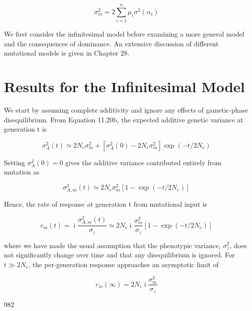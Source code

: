 \documentclass{article}
\begin{document}
{\begin{equation}
\sigma_{m}^{2}=2\sum_{i=1}^{n}\mu_{i}\sigma^{2}(\alpha_{i})
\end{equation}

We first consider the infinitesimal model before examining a more general model and the consequences of dominance. An extensive discussion of different mutational models is given in Chapter 28.

\section{Results for the Infinitesimal Model}
We start by assuming complete additivity and ignore any effects of gametic-phase disequilibrium. From Equation 11.20b, the expected additive genetic variance at generation t is

\begin{equation}
\sigma_{A}^{2}(t)\simeq2N_{e}\sigma_{m}^{2}+\left[\sigma_{A}^{2}(0)-2N_{e}\sigma_{m}^{2}\right]\exp(-t/2N_{e})
\tag{26.27}
\label{eq:26_27}
\end{equation}

Setting  $ \sigma_{A}^{2}(0)=0 $ gives the additive variance contributed entirely from mutation as

\begin{equation}
\sigma_{A,m}^{2}(t)\simeq2N_{e}\sigma_{m}^{2}\left[1-\exp(-t/2N_{e})\right]
\tag{26.28a}
\label{eq:26_28a}
\end{equation}

Hence, the rate of response at generation t from mutational input is

\begin{equation}
r_{m}(t)=\overline{\imath}\frac{\sigma_{A,m}^{2}(t)}{\sigma_{z}}\simeq2N_{e}\overline{\imath}\frac{\sigma_{m}^{2}}{\sigma_{z}}\left[1-\exp(-t/2N_{e})\right]
\tag{26.28b}
\label{eq:26_28b}
\end{equation}

where we have made the usual assumption that the phenotypic variance,  $ \sigma_z^2 $, does not significantly change over time and that any disequilibrium is ignored. For  $ t \gg 2N_e $, the per-generation response approaches an asymptotic limit of

\begin{equation}
r_{m}(\infty)=2N_{e}\bar{\imath}\frac{\sigma_{m}^{2}}{\sigma_{z}}
\tag{26.29}
\label{eq:26_29}
\end{equation}

982

}
\end{document}
